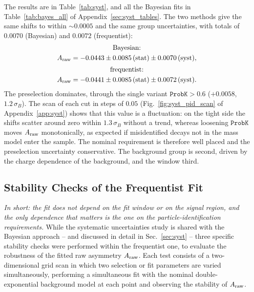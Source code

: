 The results are in Table~\ref{tab:syst}, and all the Bayesian fits in Table~\ref{tab:bayes_all} of Appendix~\ref{sec:syst_tables}. The two methods give the same shifts to within $\sim$$0.0005$ and the same group uncertainties, with totals of $0.0070$ (Bayesian) and $0.0072$ (frequentist):
\begin{gather*}
\text{Bayesian:}\\ A_{\mathrm{raw}}=-0.0443\pm0.0085\,(\text{stat})\pm0.0070\,(\text{syst}),\\[2pt]
\text{frequentist:}\\ A_{\mathrm{raw}}=-0.0441\pm0.0085\,(\text{stat})\pm0.0072\,(\text{syst}).
\end{gather*}
The preselection dominates, through the single variant $\texttt{ProbK}>0.6$ ($+0.0058$, $1.2\,\sigma_B$). The scan of each cut in steps of $0.05$ (Fig.~\ref{fig:syst_pid_scan} of Appendix~\ref{app:syst}) shows that this value is a fluctuation: on the tight side the shifts scatter around zero within $1.3\,\sigma_B$ without a trend, whereas loosening $\texttt{ProbK}$ moves $A_{\mathrm{raw}}$ monotonically, as expected if misidentified decays not in the mass model enter the sample. The nominal requirement is therefore well placed and the preselection uncertainty conservative. The background group is second, driven by the charge dependence of the background, and the window third.

\subsection{Stability Checks of the Frequentist Fit}
\label{sec:freq_syst}
\label{sec:syst_scans}
\emph{In short: the fit does not depend on the fit window or on the signal region, and the only dependence that matters is the one on the particle-identification requirements.}
While the systematic uncertainties study is shared with the Bayesian approach -- and discussed in detail in Sec.~\ref{sec:syst} -- three specific stability checks were performed within the frequentist one, to evaluate the robustness of the fitted raw asymmetry $A_{\mathrm{raw}}$. Each test consists of a two-dimensional grid scan in which two selection or fit parameters are varied simultaneously, performing a simultaneous fit with the nominal double-exponential background model at each point and observing the stability of $A_{\mathrm{raw}}$.

